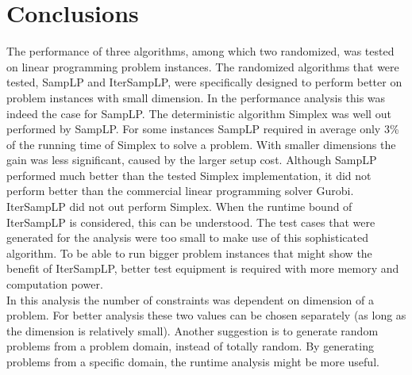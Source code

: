 \documentclass[nocopyrightspace]{acm_proc_article-sp}
\begin{document}
\section{Conclusions}
The performance of three algorithms, among which two randomized, was tested on linear programming problem instances. The randomized algorithms that were tested, SampLP and IterSampLP, were specifically designed to perform better on problem instances with small dimension. In the performance analysis this was indeed the case for SampLP. The deterministic algorithm Simplex was well out performed by SampLP. For some instances SampLP required in average only 3\% of the running time of Simplex to solve a problem. With smaller dimensions the gain was less significant, caused by the larger setup cost. Although SampLP performed much better than the tested Simplex implementation, it did not perform better than the commercial linear programming solver Gurobi. \\
IterSampLP did not out perform Simplex. When the runtime bound of IterSampLP is considered, this can be understood. The test cases that were generated for the analysis were too small to make use of this sophisticated algorithm. To be able to run bigger problem instances that might show the benefit of IterSampLP, better test equipment is required with more memory and computation power. \\
In this analysis the number of constraints was dependent on dimension of a problem. For better analysis these two values can be chosen separately (as long as the dimension is relatively small). Another suggestion is to generate random problems from a problem domain, instead of totally random. By generating problems from a specific domain, the runtime analysis might be more useful.


\balancecolumns
\end{document}

